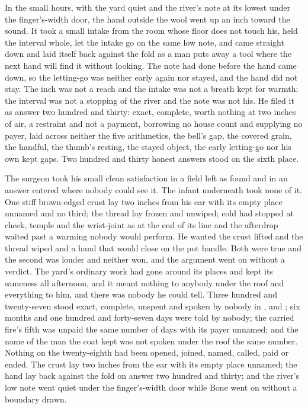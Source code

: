 In the small hours, with the yard quiet and the river's note at its lowest under the finger's-width door, the hand outside the wool went up an inch toward the sound. It took a small intake from the room whose floor does not touch his, held the interval whole, let the intake go on the same low note, and came straight down and laid itself back against the fold as a man puts away a tool where the next hand will find it without looking. The note had done before the hand came down, so the letting-go was neither early again nor stayed, and the hand did not stay. The inch was not a reach and the intake was not a breath kept for warmth; the interval was not a stopping of the river and the note was not his. He filed it as answer two hundred and thirty: exact, complete, worth nothing at two inches of air, a restraint and not a payment, borrowing no house count and supplying no payer, laid across neither the five arithmetics, the bell's gap, the covered grain, the handful, the thumb's resting, the stayed object, the early letting-go nor his own kept gaps. Two hundred and thirty honest answers stood on the sixth place.

The surgeon took his small clean satisfaction in a field left as found and in an answer entered where nobody could see it. The infant underneath took none of it. One stiff brown-edged crust lay two inches from his ear with its empty place unnamed and no third; the thread lay frozen and unwiped; cold had stopped at cheek, temple and the wrist-joint as at the end of its line and the afterdrop waited past a warming nobody would perform. He wanted the crust lifted and the thread wiped and a hand that would close on the pot handle. Both were true and the second was louder and neither won, and the argument went on without a verdict. The yard's ordinary work had gone around its places and kept its sameness all afternoon, and it meant nothing to anybody under the roof and everything to him, and there was nobody he could tell. Three hundred and twenty-seven stood exact, complete, unspent and spoken by nobody in ,  and ; six months and one hundred and forty-seven days were told by nobody; the carried fire's fifth was unpaid the same number of days with its payer unnamed; and the name of the man the coat kept was not spoken under the roof the same number. Nothing on the twenty-eighth had been opened, joined, named, called, paid or ended. The crust lay two inches from the ear with its empty place unnamed; the hand lay back against the fold on answer two hundred and thirty; and the river's low note went quiet under the finger's-width door while Bone went on without a boundary drawn.
